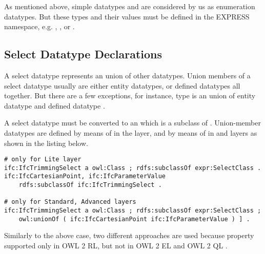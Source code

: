 As mentioned above, simple data\-types  and  are considered by us as enumeration data\-types. But these types and their values must be defined in the EXPRESS namespace, e.g. , ,  or .



\subsection{Select Datatype Declarations}
\label{subsec:ifcOWL-select-types}

A select data\-type represents an union of other data\-types. Union members of a select data\-type usually are either entity data\-types, or defined data\-types all together. But there are a few exceptions, for instance, type  is an union of entity data\-type  and defined data\-type .

\begin{ontologyRule}
A select data\-type must be converted to an  which is a subclass of . Union-member data\-types are defined by means of  in the \lite{} layer, and by means of  in \standard{} and \advanced{} layers as shown in the listing below.
\end{ontologyRule}

\begin{lstlisting}
# only for Lite layer
ifc:IfcTrimmingSelect a owl:Class ; rdfs:subclassOf expr:SelectClass .
ifc:IfcCartesianPoint, ifc:IfcParameterValue
    rdfs:subclassOf ifc:IfcTrimmingSelect .

# only for Standard, Advanced layers
ifc:IfcTrimmingSelect a owl:Class ; rdfs:subclassOf expr:SelectClass ;
    owl:unionOf ( ifc:IfcCartesianPoint ifc:IfcParameterValue ) ] .
\end{lstlisting}

Similarly to the above case, two different approaches are used because property  supported only in OWL 2 RL, but not in OWL 2 EL and OWL 2 QL \cite{w3c:owl2-profiles}. 




